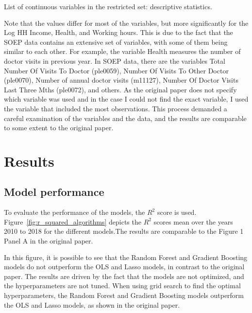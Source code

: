\documentclass[11pt, a4paper, leqno]{article}
\begin{document}
\begin{table}[htbp]
    \centering
    
    \caption{List of continuous variables in the restricted set: descriptive statistics.}
    \label{tab:descriptive_stats_continuous}
\end{table}


Note that the values differ for most of the variables, but more significantly for the Log HH Income,
Health, and Working hours. This is due to the fact that the SOEP data contains an extensive
set of variables, with some of them being similar to each other. For example, the variable Health
measures the number of doctor visits in previous year. In SOEP data, there are the variables
Total Number Of Visits To Doctor (ple0059), Number Of Visits To Other Doctor (ple0070), Number of
annual doctor visits (m11127), Number Of Doctor Visits Last Three Mths (ple0072), and others.
As the original paper does not specify which variable was used and in the case I could not find
the exact variable, I used the variable that included the most observations. This process
demanded a careful examination of the variables and the data, and the results are comparable
to some extent to the original paper.



\section{Results} %
\label{sec:results}

\subsection{Model performance}

To evaluate the performance of the models, the $R^2$ score is used. Figure~\ref{fig:r_squared_algorithms}
depicts the $R^2$ scores mean over the years 2010 to 2018 for the different models.The
results are comparable to the Figure 1 Panel A in the original paper.

In this figure, it is possible to see that the Random Forest and Gradient Boosting models
do not outperform the OLS and Lasso models, in contrast to the original paper. The results
are driven by the fact that the models are not optimized, and the hyperparameters are not
tuned. When using grid search to find the optimal hyperparameters, the Random Forest and
Gradient Boosting models outperform the OLS and Lasso models, as shown in the original paper.
\end{document}
